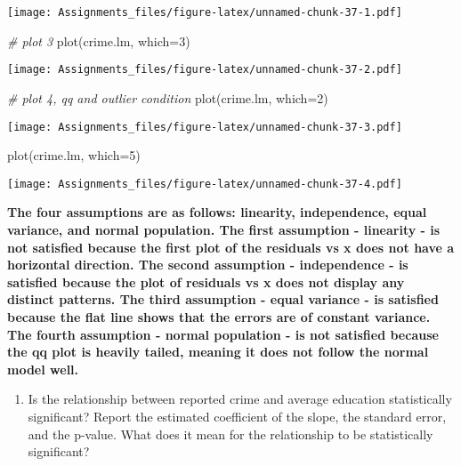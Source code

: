 \documentclass[
]{article}
\newenvironment{Shaded}{\begin{snugshade}}{\end{snugshade}}
\newcommand{\AttributeTok}[1]{\textcolor[rgb]{0.77,0.63,0.00}{#1}}
\newcommand{\CommentTok}[1]{\textcolor[rgb]{0.56,0.35,0.01}{\textit{#1}}}
\newcommand{\DecValTok}[1]{\textcolor[rgb]{0.00,0.00,0.81}{#1}}
\newcommand{\FunctionTok}[1]{\textcolor[rgb]{0.00,0.00,0.00}{#1}}
\newcommand{\NormalTok}[1]{#1}
\providecommand{\tightlist}{%
  \setlength{\itemsep}{0pt}\setlength{\parskip}{0pt}}
\begin{document}
\texttt{[image: Assignments\_files/figure-latex/unnamed-chunk-37-1.pdf]}

\begin{Shaded}
\begin{Highlighting}[]
\CommentTok{\# plot 3}
\FunctionTok{plot}\NormalTok{(crime.lm, }\AttributeTok{which=}\DecValTok{3}\NormalTok{)}
\end{Highlighting}
\end{Shaded}

\texttt{[image: Assignments\_files/figure-latex/unnamed-chunk-37-2.pdf]}

\begin{Shaded}
\begin{Highlighting}[]
\CommentTok{\# plot 4, qq and outlier condition}
\FunctionTok{plot}\NormalTok{(crime.lm, }\AttributeTok{which=}\DecValTok{2}\NormalTok{)}
\end{Highlighting}
\end{Shaded}

\texttt{[image: Assignments\_files/figure-latex/unnamed-chunk-37-3.pdf]}

\begin{Shaded}
\begin{Highlighting}[]
\FunctionTok{plot}\NormalTok{(crime.lm, }\AttributeTok{which=}\DecValTok{5}\NormalTok{)}
\end{Highlighting}
\end{Shaded}

\texttt{[image: Assignments\_files/figure-latex/unnamed-chunk-37-4.pdf]}

\textbf{The four assumptions are as follows: linearity, independence,
equal variance, and normal population. The first assumption - linearity
- is not satisfied because the first plot of the residuals vs x does not
have a horizontal direction. The second assumption - independence - is
satisfied because the plot of residuals vs x does not display any
distinct patterns. The third assumption - equal variance - is satisfied
because the flat line shows that the errors are of constant variance.
The fourth assumption - normal population - is not satisfied because the
qq plot is heavily tailed, meaning it does not follow the normal model
well.}

\begin{enumerate}
\def\labelenumi{\arabic{enumi}.}
\setcounter{enumi}{4}
\tightlist
\item
  Is the relationship between reported crime and average education
  statistically significant? Report the estimated coefficient of the
  slope, the standard error, and the p-value. What does it mean for the
  relationship to be statistically significant?
\end{enumerate}
\end{document}
